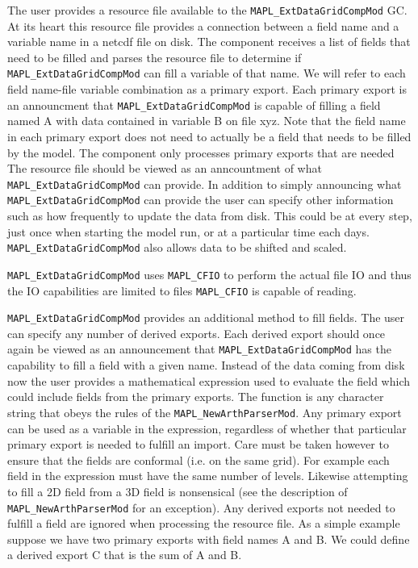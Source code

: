 The user provides a resource file available to the {\tt MAPL\_ExtDataGridCompMod} GC.
At its heart this resource file provides a connection between a field name and a variable name in
a netcdf file on disk. The component receives a list of fields that need to be filled
and parses the resource file to determine if {\tt MAPL\_ExtDataGridCompMod} can fill a variable of that name.
We will refer to each field name-file variable combination as a primary export.
Each primary export is an
announcment that {\tt MAPL\_ExtDataGridCompMod} is capable of filling a field named A with data contained in variable B on file xyz.
Note that the field name in each primary export does not need to actually be a field
that needs to be filled by the model. The component only processes primary exports that are needed
The resource file should be viewed as an anncountment of what {\tt MAPL\_ExtDataGridCompMod} can provide.
In addition to simply announcing what {\tt MAPL\_ExtDataGridCompMod} can provide
the user can specify other information such as how frequently to update the data from
disk. This could be at every step, just once when starting the model run, or at a particular
time each days. {\tt MAPL\_ExtDataGridCompMod} also allows data to be shifted and scaled.

{\tt MAPL\_ExtDataGridCompMod} uses {\tt MAPL\_CFIO} to perform the actual file IO and thus the
IO capabilities are limited to files {\tt MAPL\_CFIO} is capable of reading.

{\tt MAPL\_ExtDataGridCompMod} provides an additional method to fill fields. The user can specify
any number of derived exports. Each derived export should once again be viewed as an announcement that
{\tt MAPL\_ExtDataGridCompMod} has the capability to fill a field with a given name.
Instead of the data coming from disk now the user provides a mathematical expression used to evaluate the field
which could include fields from the primary exports.
The function is any character string that obeys
the rules of the {\tt MAPL\_NewArthParserMod}. Any primary export can be used as a variable in the expression,
regardless of whether
that particular primary export is needed to fulfill an import. Care must be taken however
to ensure that the fields are conformal (i.e. on the same grid). For example each field in the expression must have the
same number of levels. Likewise attempting to fill a 2D field from a 3D field is nonsensical
(see the description of {\tt MAPL\_NewArthParserMod} for an exception). 
Any derived exports not needed to fulfill a field are ignored when processing the resource file.
As a simple example suppose we have two primary exports with field names A and B. We could
define a derived export C that is the sum of A and B.

